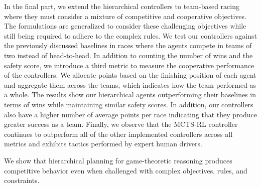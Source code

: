 \documentclass[12pt]{report}
\theoremstyle{definition}
\theoremstyle{remark}
\numberwithin{equation}{section}
\begin{document}
In the final part, we extend the hierarchical controllers to team-based racing where they must consider a mixture of competitive and cooperative objectives. The formulations are generalized to consider these challenging objectives while still being required to adhere to the complex rules. We test our controllers against the previously discussed baselines in races where the agents compete in teams of two instead of head-to-head. In addition to counting the number of wins and the safety score, we introduce a third metric to measure the cooperative performance of the controllers. We allocate points based on the finishing position of each agent and aggregate them across the teams, which indicates how the team performed as a whole. The results show our hierarchical agents outperforming their baselines in terms of wins while maintaining similar safety scores. In addition, our controllers also have a higher number of average points per race indicating that they produce greater success as a team. Finally, we observe that the MCTS-RL controller continues to outperform all of the other implemented controllers across all metrics and exhibits tactics performed by expert human drivers.

We show that hierarchical planning for game-theoretic reasoning produces competitive behavior even when challenged with complex objectives, rules, and constraints.


\tableofcontents   %

\listoftables      %
\listoffigures     %


% 






\appendices

\nocite{*}  
\end{document}
